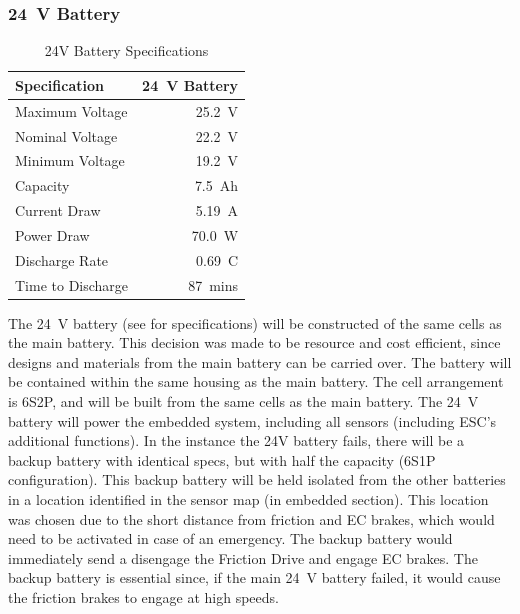 \documentclass[main.tex]{subfiles}
\begin{document}
    \subsubsection{\textbf{\SI{24}{V}} Battery}
    \begin{table}
        \centering
        \begin{tabular}{@{}lr@{}} \toprule
            Specification & \SI{24}{V} Battery\\ \midrule
            Maximum Voltage & \SI{25.2}{V}\\
            Nominal Voltage & \SI{22.2}{V}\\
            Minimum Voltage & \SI{19.2}{V}\\
            Capacity & \SI{7.5}{Ah}\\
            Current Draw & \SI{5.19}{A}\\
            Power Draw & \SI{70.0}{W}\\
            Discharge Rate & \SI{0.69}{C}\\
            Time to Discharge & \SI{87}{mins}\\ \bottomrule
        \end{tabular}
        \caption{24V Battery Specifications}
        \label{tab:24V-bat-specs}
    \end{table}
    The \SI{24}{V} battery (see  for specifications) will be constructed of the same cells as the main battery. This decision was made to be resource and cost efficient, since designs and materials from the main battery can be carried over. The battery will be contained within the same housing as the main battery. The cell arrangement is 6S2P, and will be built from the same cells as the main battery. The \SI{24}{V} battery will power the embedded system, including all sensors (including ESC’s additional functions). In the instance the 24V battery fails, there will be a backup battery with identical specs, but with half the capacity (6S1P configuration). This backup battery will be held isolated from the other batteries in  a location identified in the sensor map (in embedded section). This location was chosen due to the short distance from friction and EC brakes, which would need to be activated in case of an emergency. The backup battery would immediately send a disengage the Friction Drive and engage EC brakes. The backup battery is essential since, if the main \SI{24} {V} battery failed, it would cause the friction brakes to engage at high speeds.
\end{document}

